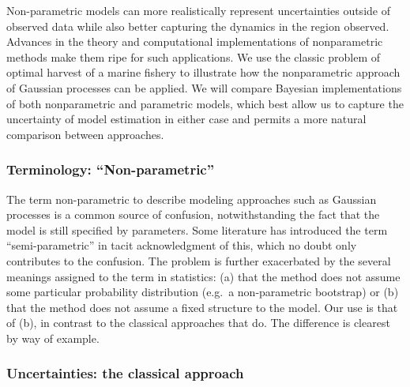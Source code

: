 \documentclass[author-year, review]{elsarticle} %
\begin{document}
Non-parametric models can more realistically represent uncertainties
outside of observed data while also better capturing the dynamics in the
region observed. Advances in the theory and computational
implementations of nonparametric methods make them ripe for such
applications. We use the classic problem of optimal harvest of a marine
fishery to illustrate how the nonparametric approach of Gaussian
processes can be applied. We will compare Bayesian implementations of
both nonparametric and parametric models, which best allow us to capture
the uncertainty of model estimation in either case and permits a more
natural comparison between approaches.

\subsubsection{Terminology: ``Non-parametric''}

The term non-parametric to describe modeling approaches such as Gaussian
processes is a common source of confusion, notwithstanding the fact that
the model is still specified by parameters. Some literature has
introduced the term ``semi-parametric'' in tacit acknowledgment of this,
which no doubt only contributes to the confusion. The problem is further
exacerbated by the several meanings assigned to the term in statistics:
(a) that the method does not assume some particular probability
distribution (e.g.~a non-parametric bootstrap) or (b) that the method
does not assume a fixed structure to the model. Our use is that of (b),
in contrast to the classical approaches that do. The difference is
clearest by way of example.

\subsubsection{Uncertainties: the classical approach}
\end{document}
